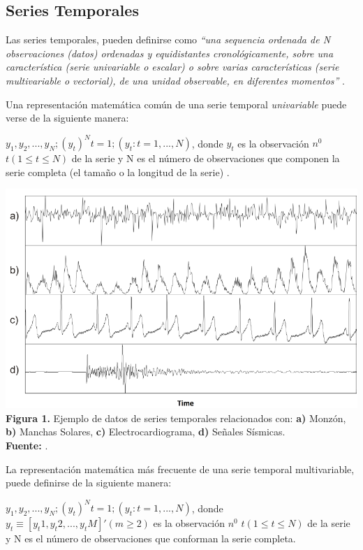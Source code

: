 \subsection{Series Temporales}
Las series temporales, pueden definirse como \textit{\enquote{una sequencia ordenada de N observaciones (datos) ordenadas y equidistantes cronol\'ogicamente, sobre una caracter\'istica (serie univariable o escalar) o sobre varias caracter\'isticas (serie multivariable o vectorial), de una unidad observable, en diferentes momentos}} \cite{tak-chung}.\\\par
Una representaci\'on matem\'atica com\'un de una serie temporal \textit{univariable} puede verse de la siguiente manera:\par
$y_1, y_2,...,y_N; (y_t)^N t=1; (y_t:t=1,...,N)$, donde $y_t$ es la observaci\'on $n^0$ $t(1 \leq t \leq N)$ de la serie y N es el n\'umero de observaciones que componen la serie completa (el tama\~no o la longitud de la serie) \cite{concepts}.
\begin{center}
\includegraphics[scale=0.7]{timeSeries.png}\\
\vspace*{10pt}
\footnotesize{\textbf{Figura 1.} Ejemplo de datos de series temporales relacionados con: \textbf{a)} Monz\'on, \textbf{b)} Manchas Solares, \textbf{c)} Electrocardiograma, \textbf{d)} Se\~nales S\'ismicas.}\\ \textbf{Fuente:} \cite{concepts}.
\end{center}
La representaci\'on matem\'atica m\'as frecuente de una serie temporal multivariable, puede definirse de la siguiente manera:\par
$y_1, y_2,...,y_N; (y_t)^N t=1; (y_t: t=1,...,N)$, donde $y_t \equiv [y_t1, y_t2,...,y_tM]' (m \geq 2)$ es la observaci\'on $n^0$ $t(1 \leq t \leq N)$ de la serie y N es el n\'umero de observaciones que conforman la serie completa.\par
